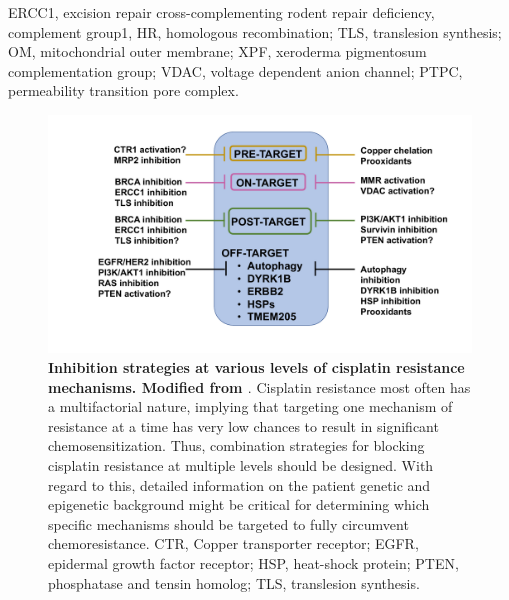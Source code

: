 \begin{table}[htbp]
\begin{tabular}{p{1.5cm}p{5cm}p{5cm}p{1cm}}
    \hline
     \end{tabular}%
  \begin{tablenotes}
      \small
      \item  {ERCC1, excision repair cross-complementing rodent repair deficiency, complement group1, HR, homologous recombination; TLS, translesion synthesis; OM, mitochondrial outer membrane; XPF, xeroderma pigmentosum complementation group; VDAC, voltage dependent anion channel; PTPC, permeability transition pore complex.}
    \end{tablenotes}
 
   \label{tab:ontarget}%
 \end{table}%


\begin{figure}
\centering
\includegraphics[width=\textwidth]{Figures/chap1/circumventingcisplatinresistance.pdf}
	\caption[Mechanism of action of cisplatin]
	{\small
	    \textbf{Inhibition strategies at various levels of cisplatin resistance mechanisms. Modified from  \cite{galluzzi2012molecular}}.
	     Cisplatin resistance most often has a multifactorial nature, implying that targeting one mechanism of resistance at a time has very low chances to result in significant chemosensitization. Thus, combination strategies for blocking cisplatin resistance at multiple levels should be designed. With regard to this, detailed information on the patient genetic and epigenetic background might be critical for determining which specific mechanisms should be targeted to fully circumvent chemoresistance. CTR, Copper transporter receptor; EGFR, epidermal growth factor receptor; HSP, heat-shock protein; PTEN, phosphatase and tensin homolog; TLS, translesion synthesis.
	}
	\label{fig:circumventingcisplatinresistance}
\end{figure}

